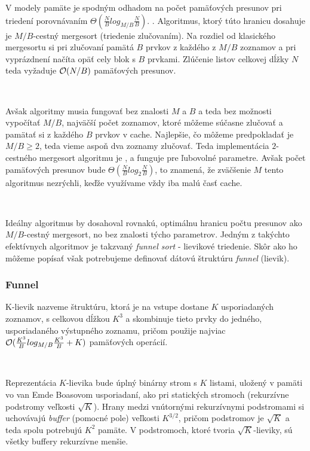 \documentclass[12pt,a4paper]{article}
\begin{document}
V \aware modely pamäte je spodným odhadom na počet pamäťových presunov pri triedení porovnávaním $\Theta(\frac{N}{B}log_{M/B}\frac{N}{B})$. \citep{AggVitt88, Demaine02}. Algoritmus, ktorý túto hranicu dosahuje je $M/B$-cestný mergesort (triedenie zlučovaním). Na rozdiel od klasického mergesortu si pri zlučovaní pamätá $B$ prvkov z každého z $M/B$ zoznamov a pri vyprázdnení načíta opäť cely blok s $B$ prvkami. Zlúčenie listov celkovej dĺžky $N$ teda vyžaduje $\mathcal{O}(N/B)$ pamäťových presunov.

\

Avšak \obliv algoritmy musia fungovať bez znalosti $M$ a $B$ a teda bez možnosti vypočítať $M/B$, najväčší počet zoznamov, ktoré môžeme súčasne zlučovať a pamätať si z každého $B$ prvkov v cache. Najlepšie, čo môžeme predpokladať je $M/B \ge 2$, teda vieme aspoň dva zoznamy zlučovať. Teda implementácia $2$-cestného mergesort algoritmu je \obliv, a funguje pre ľubovolné parametre. Avšak počet pamäťových presunov bude $\Theta(\frac{N}{B}log_{2}\frac{N}{B})$, to znamená, že zväčšenie $M$ tento algoritmus nezrýchli, keďže využívame vždy iba malú časť cache. 

\

Ideálny \obliv algoritmus by dosahoval rovnakú, optimálnu hranicu počtu presunov ako $M/B$-cestný mergesort, no bez znalosti týcho parametrov. Jedným z takýchto efektívnych \obliv algoritmov je takzvaný {\em funnel sort} - lievikové triedenie. Skôr ako ho môžeme popísať však potrebujeme definovať dátovú štruktúru {\em funnel} (lievik).

\subsubsection{Funnel}

K-lievik nazveme štruktúru, ktorá je na vstupe dostane $K$ usporiadaných zoznamov, s celkovou dĺžkou $K^3$ a skombinuje tieto prvky do jedného, usporiadaného výstupného zoznamu, pričom použije najviac $\mathcal{O}(\frac{K^3}{B} log_{M/B} \frac{K^3}{B} + K)$ pamäťových operácií.

\

Reprezentácia $K$-lievika bude úplný binárny strom s $K$ listami, uložený v pamäti vo van Emde Boasovom usporiadaní, ako pri statických stromoch (rekurzívne podstromy veľkosti $\sqrt{K}$). Hrany medzi vnútornými rekurzívnymi podstromami si uchovávajú {\em buffer} (pomocné pole) veľkosti $K^{3/2}$, pričom podstromov je $\sqrt{K}$ a teda spolu potrebujú $K^2$ pamäte. V podstromoch, ktoré tvoria $\sqrt{K}$-lieviky, sú všetky buffery rekurzívne menšie.
\end{document}
